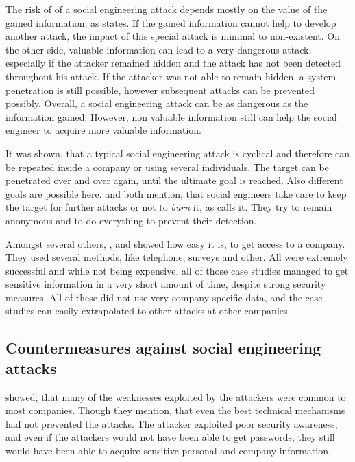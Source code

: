 The risk of of a social engineering attack depends mostly on the value of the
gained information, as \cite{thornburgh2004} states. If the gained information
cannot help to develop another attack, the impact of this special attack is
minimal to non-existent. On the other side, valuable information can lead to a
very dangerous attack, especially if the attacker remained hidden and the
attack has not been detected throughout his attack. If the attacker was not
able to remain hidden, a system penetration is still possible, however
subsequent attacks can be prevented possibly. Overall, a social engineering
attack can be as dangerous as the information gained. However, non valuable
information still can help the social engineer to acquire more valuable
information.

It was shown, that a typical social engineering attack is cyclical and
therefore can be repeated inside a company or using several individuals. The
target can be penetrated over and over again, until the ultimate goal is
reached. Also different goals are possible here. \cite{thornburgh2004} and
\cite{mitnick2003} both mention, that social engineers take care to keep the
target for further attacks or not to \textit{burn} it, as \cite{thornburgh2004}
calls it. They try to remain anonymous and to do everything to prevent their
detection.

Amongst several others, \cite{mitnick2003}, \cite{orgill2004} and
\cite{winkler1995} showed how easy it is, to get access to a company. They used
several methods, like telephone, surveys and other. All were extremely
successful and while not being expensive, all of those case studies managed to
get sensitive information in a very short amount of time, despite strong
security measures. All of these did not use very company specific data, and the
case studies can easily extrapolated to other attacks at other companies.

\subsection{Countermeasures against social engineering attacks}

\cite{winkler1995} showed, that many of the weaknesses exploited by the
attackers were common to most companies. Though they mention, that even the
best technical mechanisms had not prevented the attacks. The attacker exploited
poor security awareness, and even if the attackers would not have been able to
get passwords, they still would have been able to acquire sensitive personal
and company information.

